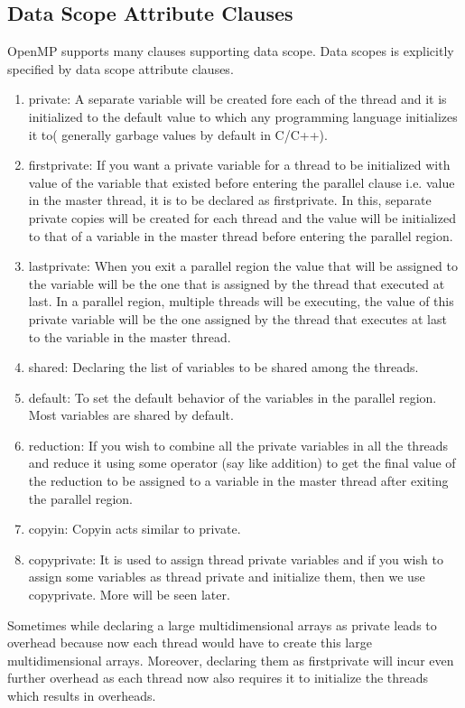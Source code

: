 \documentclass[12pt]{article}
\begin{document}
\subsection{Data Scope Attribute Clauses}
OpenMP supports many clauses supporting data scope. Data scopes is explicitly specified by data scope attribute clauses.

\begin{enumerate}
    \item private: A separate variable will be created fore each of the thread and it is initialized to the default value to which any programming language initializes it to( generally garbage values by default in C/C++).
    \item firstprivate:  If you want a private variable for a thread to be initialized with value of the variable that existed before entering the parallel clause i.e. value in the master thread, it is to be declared as firstprivate. In this, separate private copies will be created for each thread and the value will be initialized to that of a variable in the master thread before entering the parallel region.
    \item lastprivate: When you exit a parallel region the value that will be assigned to the variable will be the one that is assigned by the thread that executed at last. In a parallel region, multiple threads will be executing, the value of this private variable will be the one assigned by the thread that executes at last to the variable in the master thread.
    \item shared: Declaring the list of variables to be shared among the threads.
    \item default: To set the default behavior of the variables in the parallel region. Most variables are shared by default.
    \item reduction: If you wish to combine all the private variables in all the threads and reduce it using some operator (say like addition) to get the final value of the reduction to be assigned to a variable in the master thread after exiting the parallel region.
    \item copyin: Copyin acts similar to private.
    \item copyprivate: It is used to assign thread private variables and if you wish to assign some variables as thread private and initialize them, then we use copyprivate. More will be seen later.
\end{enumerate}
Sometimes while declaring a large multidimensional arrays as private leads to overhead because now each thread would have to create this large multidimensional arrays. Moreover, declaring them as firstprivate will incur even further overhead as each thread now also requires it to initialize the threads which results in overheads.
\end{document}
